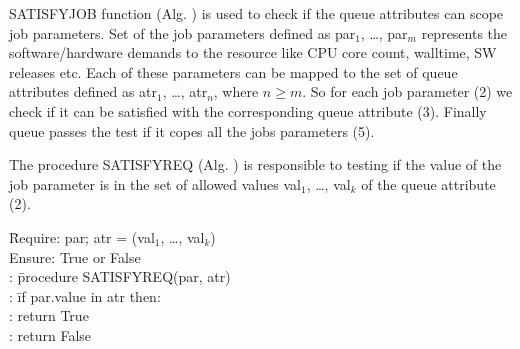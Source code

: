 SATISFY{\textunderscore}JOB function (Alg. ) is used to check if the queue
attributes can scope job parameters. Set of the job parameters defined as
par$_1$, \ldots, par$_m$ represents the software/hardware demands to the
resource like CPU core count, walltime, SW releases etc. Each of these
parameters can be mapped to the set of queue attributes defined as atr$_1$,
\ldots, atr$_n$, where $n \geq m$. So for each job parameter (2) we check if
it can be satisfied with the corresponding queue attribute (3). Finally queue
passes the test if it copes all the jobs parameters (5).

The procedure SATISFY{\textunderscore}REQ (Alg. ) is responsible to testing
if the value of the job parameter is in the set of allowed values val$_1$,
\ldots, val$_k$ of the queue attribute (2).




% 

\begin{tabbing}
\hspace{0.5in}\=
     Require: par; atr = (val$_1$, \ldots, val$_k$) \\
  \> Ensure: True or False \\
  : \hspace{1em}\= procedure SATISFY{\textunderscore}REQ(par, atr) \\
  :             \> \hspace{1em}\= if par.value in atr then: \\
  :             \>             \> return True \\
  :             \>             \> \hspace{0.1in} return False
\end{tabbing}

